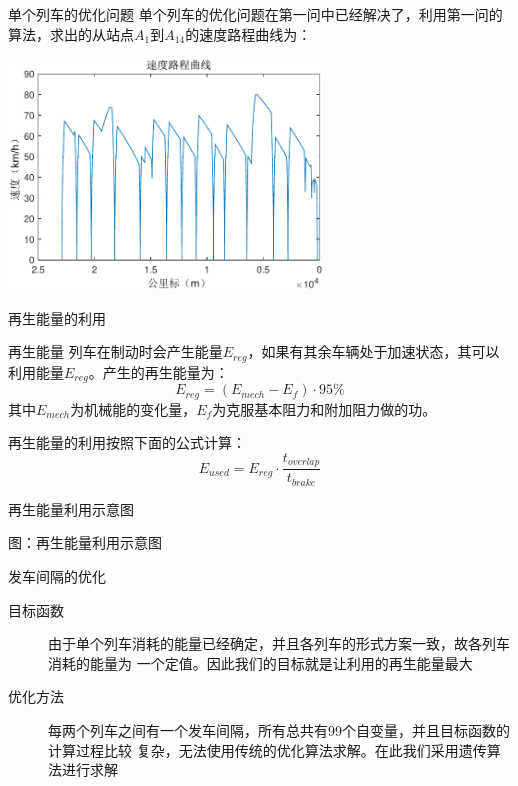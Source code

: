 \documentclass{beamer}
\begin{document}
\begin{frame}{单个列车的优化问题}
单个列车的优化问题在第一问中已经解决了，利用第一问的算法，求出的从站点$A_1$到$A_{14}$的速度路程曲线为：

\begin{center}
\includegraphics[width=8.3cm]{fig/fig11/fig11.pdf}
\end{center}
\end{frame}

\begin{frame}{再生能量的利用}

\begin{block}{再生能量}
列车在制动时会产生能量$E_{reg}$，如果有其余车辆处于加速状态，其可以利用能量$E_{reg}$。产生的再生能量为：
$$E_{reg} = (E_{mech} - E_f) \cdot 95 \%$$
其中$E_{mech}$为机械能的变化量，$E_f$为克服基本阻力和附加阻力做的功。
\end{block}

再生能量的利用按照下面的公式计算：
$$E_{used} = E_{reg} \cdot \frac{t_{overlap}}{t_{brake}}$$

\end{frame}

\begin{frame}{再生能量利用示意图}
\begin{center}
图：再生能量利用示意图
\end{center}

\end{frame}

\begin{frame}{发车间隔的优化}

\begin{description}
    \item[目标函数] 由于单个列车消耗的能量已经确定，并且各列车的形式方案一致，故各列车消耗的能量为
    一个定值。因此我们的目标就是让利用的再生能量最大
    \item[优化方法] 每两个列车之间有一个发车间隔，所有总共有99个自变量，并且目标函数的计算过程比较
    复杂，无法使用传统的优化算法求解。在此我们采用遗传算法进行求解
\end{description}

\end{frame}
\end{document}
